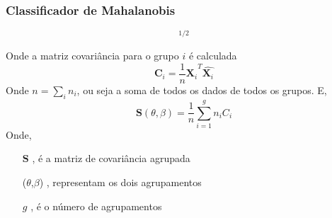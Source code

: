 \documentclass[aspectratio=10]{beamer} %
\begin{document}
\begin{frame}
	\frametitle{Classificador de Mahalanobis}
	\begin{tcolorbox}[colback=gray!5,colframe=blue!40!black,title=Definição]
		\begin{equation}
		[(\bar{\textbf{x}_{i}}-\bar{\textbf{x}}_{j})^{T}\textbf{S}^{-1}(\bar{\textbf{y}}_{i}-\bar{\textbf{y}}_{j})]^{1/2} \nonumber
		\label{eq5}
		\end{equation}
	\end{tcolorbox}
	\pause
	Onde a  matriz covariância para o grupo $i$ é calculada
	\pause
\begin{equation}
\textbf{C}_{i}=\dfrac{1}{n} \hat{\textbf{X}_{i}}^{T}\hat{\textbf{X}_{i}} \nonumber
\end{equation}
\pause
Onde $n=\sum_{i} n_{i}$, ou seja a soma de todos os dados de todos os grupos. E,
\pause
\begin{equation}
\textbf{S}(\theta, \beta)=\dfrac{1}{n}\sum^{g}_{i=1}n_{i}C_{i} \nonumber
\end{equation}
Onde,
\begin{itemize}
	\item[$\textbf{S}$], é a matriz de covariância agrupada
	\pause
	 \item[($\theta$,$\beta$)], representam os dois agrupamentos
	 \pause
	 \item[$g$], é o número de agrupamentos
\end{itemize}

\end{frame}


%
\end{document}
